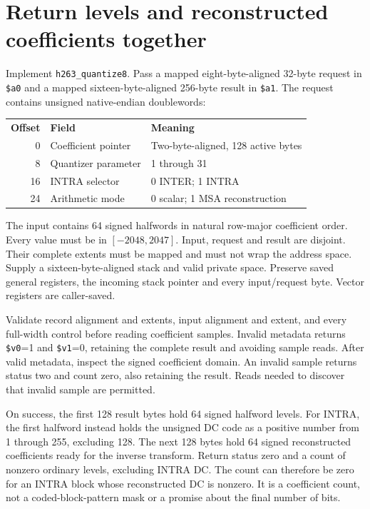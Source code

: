 \section{Return levels and reconstructed coefficients together}
Implement \texttt{h263\_quantize8}. Pass a mapped eight-byte-aligned 32-byte
request in \texttt{\$a0} and a mapped sixteen-byte-aligned 256-byte result in
\texttt{\$a1}. The request contains unsigned native-endian doublewords:
\begin{center}
  \begin{tabular}{rll}
    \textbf{Offset} & \textbf{Field}      & \textbf{Meaning}                   \\
    0               & Coefficient pointer & Two-byte-aligned, 128 active bytes \\
    8               & Quantizer parameter & 1 through 31                       \\
    16              & INTRA selector      & 0 INTER; 1 INTRA                   \\
    24              & Arithmetic mode     & 0 scalar; 1 MSA reconstruction
  \end{tabular}
\end{center}
The input contains 64 signed halfwords in natural row-major coefficient order.
Every value must be in $[-2048,2047]$. Input, request and result are disjoint.
Their complete extents must be mapped and must not wrap the address space.
Supply a sixteen-byte-aligned stack and valid private space. Preserve saved
general registers, the incoming stack pointer and every input/request byte.
Vector registers are caller-saved.

Validate record alignment and extents, input alignment and extent, and every
full-width control before reading coefficient samples. Invalid metadata returns
\texttt{\$v0}=1 and \texttt{\$v1}=0, retaining the complete result and avoiding
sample reads. After valid metadata, inspect the signed coefficient domain. An
invalid sample returns status two and count zero, also retaining the result.
Reads needed to discover that invalid sample are permitted.

On success, the first 128 result bytes hold 64 signed halfword levels. For INTRA,
the first halfword instead holds the unsigned DC code as a positive number from
1 through 255, excluding 128. The next 128 bytes hold 64 signed reconstructed
coefficients ready for the inverse transform. Return status zero and a count of
nonzero ordinary levels, excluding INTRA DC. The count can therefore be zero
for an INTRA block whose reconstructed DC is nonzero. It is a coefficient count,
not a coded-block-pattern mask or a promise about the final number of bits.

